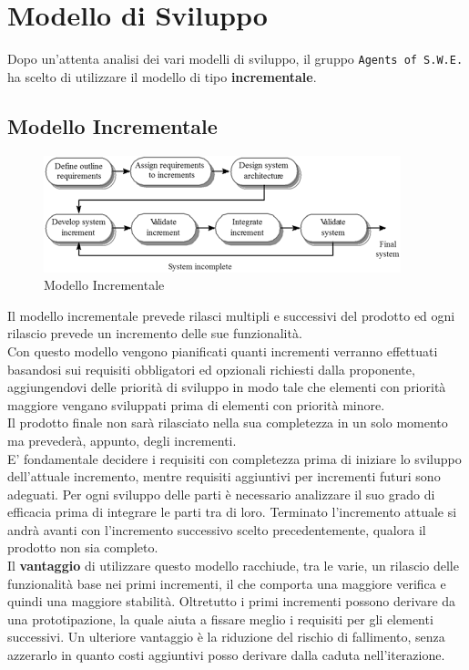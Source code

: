 \section{Modello di Sviluppo}
\label{ModelloSviluppo}

Dopo un'attenta analisi dei vari modelli di sviluppo, il gruppo \texttt{Agents of S.W.E.} ha scelto di utilizzare il modello di tipo \textbf{incrementale}.

\subsection{Modello Incrementale}

\begin{figure}[h]
	\centering
  		\includegraphics[width=0.7\linewidth]{./images/modelloincrementale.png}
  		\caption{Modello Incrementale}
  		\label{fig:Modello Incrementale}
\end{figure}

Il modello incrementale prevede rilasci multipli e successivi del prodotto ed ogni rilascio prevede un incremento delle sue funzionalità. \\
Con questo modello vengono pianificati quanti incrementi verranno effettuati basandosi sui requisiti obbligatori ed opzionali richiesti dalla proponente, aggiungendovi delle priorità di sviluppo in modo tale che elementi con priorità maggiore vengano sviluppati prima di elementi con priorità minore.\\
Il prodotto finale non sarà rilasciato nella sua completezza in un solo momento ma prevederà, appunto, degli incrementi. \\
E' fondamentale decidere i requisiti con completezza prima di iniziare lo sviluppo dell'attuale incremento, mentre requisiti aggiuntivi per incrementi futuri sono adeguati. Per ogni sviluppo delle parti è necessario analizzare il suo grado di efficacia prima di integrare le parti tra di loro. Terminato l'incremento attuale si andrà avanti con l'incremento successivo scelto precedentemente, qualora il prodotto non sia completo. \\
Il \textbf{vantaggio} di utilizzare questo modello racchiude, tra le varie, un rilascio delle funzionalità base nei primi incrementi, il che comporta una maggiore verifica e quindi una maggiore stabilità. Oltretutto i primi incrementi possono derivare da una prototipazione, la quale aiuta a fissare meglio i requisiti per gli elementi successivi. Un ulteriore vantaggio è la riduzione del rischio di fallimento, senza azzerarlo in quanto costi aggiuntivi posso derivare dalla caduta nell'iterazione\glossario.

